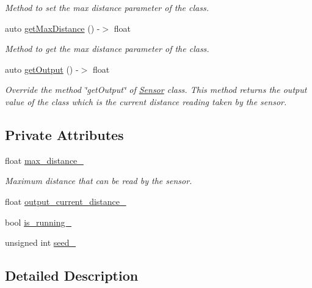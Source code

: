 \begin{DoxyCompactItemize}
\begin{DoxyCompactList}\small\item\em Method to set the max distance parameter of the class. \end{DoxyCompactList}\item 
auto \hyperlink{class_ultrasonic_sensor_af1ea4298d3ac580095e59d4b63e9076c}{get\+Max\+Distance} () -\/$>$ float
\begin{DoxyCompactList}\small\item\em Method to get the max distance parameter of the class. \end{DoxyCompactList}\item 
auto \hyperlink{class_ultrasonic_sensor_a0776a669d6c30958fe316cb2daa3e6e7}{get\+Output} () -\/$>$ float
\begin{DoxyCompactList}\small\item\em Override the method \char`\"{}get\+Output\char`\"{} of \hyperlink{class_sensor}{Sensor} class. This method returns the output value of the class which is the current distance reading taken by the sensor. \end{DoxyCompactList}\end{DoxyCompactItemize}
\subsection*{Private Attributes}
\begin{DoxyCompactItemize}
\item 
float \hyperlink{class_ultrasonic_sensor_a7a41e3e74c23db857fd6cc3728439461}{max\+\_\+distance\+\_\+}
\begin{DoxyCompactList}\small\item\em Maximum distance that can be read by the sensor. \end{DoxyCompactList}\item 
float \hyperlink{class_ultrasonic_sensor_a96a5d6ca72fcbe545ea88f504b24b44a}{output\+\_\+current\+\_\+distance\+\_\+}
\item 
bool \hyperlink{class_ultrasonic_sensor_a7d98b5005d41e9bb8fd84c71dde4079a}{is\+\_\+running\+\_\+}
\item 
unsigned int \hyperlink{class_ultrasonic_sensor_a3d7bb6ec05405169a0ea40432a79e318}{seed\+\_\+}
\end{DoxyCompactItemize}


\subsection{Detailed Description}


